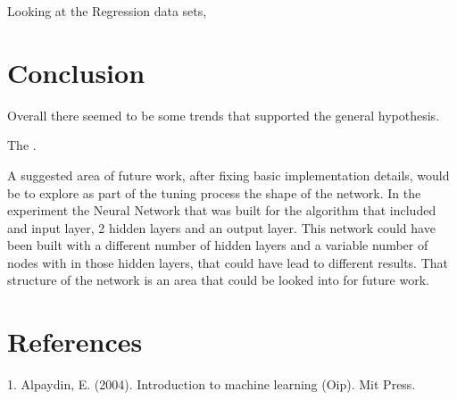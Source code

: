 \documentclass[twoside,11pt]{article}
\begin{document}
\hspace*{10mm} Looking at the Regression data sets,\\


\section{Conclusion}
\hspace*{10mm} Overall there seemed to be some trends that supported the general hypothesis. \newline

\hspace*{10mm} The .\newline

\hspace*{10mm} A suggested area of future work, after fixing basic implementation details, would be to explore as part of the tuning process the shape of the network. In the experiment the Neural Network that was built for the algorithm that included and input layer, 2 hidden layers and an output layer. This network could have been built with a different number of hidden layers and a variable number of nodes with in those hidden layers, that could have lead to different results. That structure of the network is an area that could be looked into for future work. \newline

\section{References}
1. Alpaydin, E. (2004). Introduction to machine learning (Oip). Mit Press. 

\newpage
\end{document}
